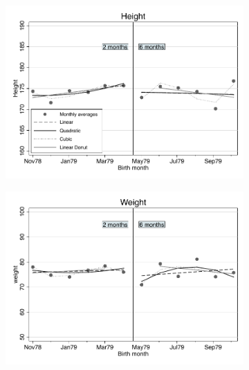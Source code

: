 \documentclass[a4paper ]{article}
\begin{document}
\clearpage
\newpage
\begin{figure}[p]
\begin{subfigure}[h]{0.48\textwidth}\centering
	\includegraphics[width=\textwidth]{../../analysis/graphs/SOEP/Height_RD.pdf}
\end{subfigure}
\quad
\begin{subfigure}[h]{0.48\textwidth}\centering
	\includegraphics[width=\textwidth]{../../analysis/graphs/SOEP/Weight_RD.pdf}
\end{subfigure}


\end{figure}
\end{document}
